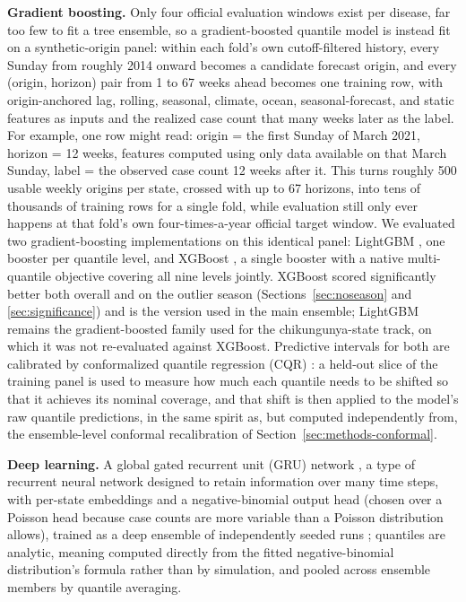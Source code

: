 \documentclass[11pt]{article}
\begin{document}
\noindent\textbf{Gradient boosting.} Only four official evaluation windows exist per disease, far
too few to fit a tree ensemble, so a gradient-boosted quantile model is instead fit on a
synthetic-origin panel: within each fold's own cutoff-filtered history, every Sunday from roughly
2014 onward becomes a candidate forecast origin, and every (origin, horizon) pair from 1 to 67 weeks
ahead becomes one training row, with origin-anchored lag, rolling, seasonal, climate, ocean,
seasonal-forecast, and static features as inputs and the realized case count that many weeks later
as the label. For example, one row might read: origin = the first Sunday of March 2021, horizon = 12
weeks, features computed using only data available on that March Sunday, label = the observed case
count 12 weeks after it. This turns roughly 500 usable weekly origins per state, crossed with up to
67 horizons, into tens of thousands of training rows for a single fold, while evaluation still only
ever happens at that fold's own four-times-a-year official target window. We evaluated two
gradient-boosting implementations on this identical panel: LightGBM \citep{ke2017}, one booster per
quantile level, and XGBoost \citep{chen2016}, a single booster with a native multi-quantile
objective covering all nine levels jointly. XGBoost scored significantly better both overall and on
the outlier season (Sections~\ref{sec:noseason} and \ref{sec:significance}) and is the version used
in the main ensemble; LightGBM remains the gradient-boosted family used for the chikungunya-state
track, on which it was not re-evaluated against XGBoost. Predictive intervals for both are
calibrated by conformalized quantile regression (CQR) \citep{romano2019}: a held-out slice of the
training panel is used to measure how much each quantile needs to be shifted so that it achieves its
nominal coverage, and that shift is then applied to the model's raw quantile predictions, in the
same spirit as, but computed independently from, the ensemble-level conformal recalibration of
Section~\ref{sec:methods-conformal}.

\noindent\textbf{Deep learning.} A global gated recurrent unit (GRU) network \citep{cho2014}, a type
of recurrent neural network designed to retain information over many time steps, with
per-state embeddings and a negative-binomial output head (chosen over a Poisson head because case
counts are more variable than a Poisson distribution allows), trained as a deep ensemble of
independently seeded runs \citep{lakshminarayanan2017}; quantiles are analytic, meaning computed
directly from the fitted negative-binomial distribution's formula rather than by simulation, and
pooled across ensemble members by quantile averaging.
\end{document}
